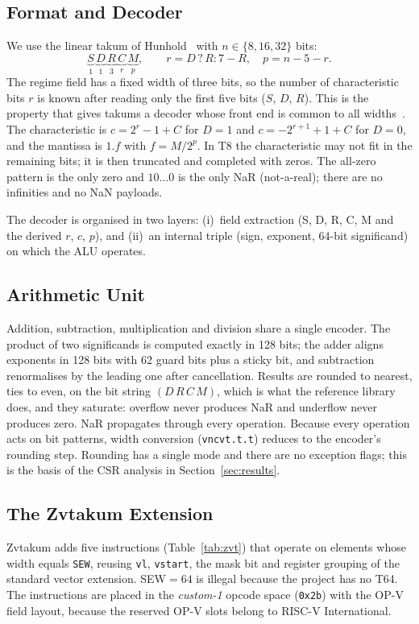 \documentclass[conference]{IEEEtran}
\begin{document}
\subsection{Format and Decoder}
We use the linear takum of Hunhold~\cite{hunhold2024takum} with $n\in\{8,16,32\}$ bits:
\begin{equation}
\underbrace{S}_{1}\,\underbrace{D}_{1}\,\underbrace{R}_{3}\,\underbrace{C}_{r}\,\underbrace{M}_{p},
\qquad r = D\,?\,R : 7-R,\quad p = n-5-r .
\end{equation}
The regime field has a fixed width of three bits, so the number of characteristic
bits $r$ is known after reading only the first five bits ($S$, $D$, $R$). This is the
property that gives takums a decoder whose front end is common to all widths~\cite{hunhold2025avx}.
The characteristic is $c = 2^r-1+C$ for $D=1$ and $c=-2^{r+1}+1+C$ for $D=0$, and the
mantissa is $1.f$ with $f=M/2^p$. In T8 the characteristic may not fit in the
remaining bits; it is then truncated and completed with zeros. The all-zero pattern is the
only zero and $10\ldots0$ is the only NaR (not-a-real); there are no infinities and no NaN payloads.

The decoder is organised in two layers: (i)~field extraction (S, D, R, C, M and the derived $r$, $c$, $p$),
and (ii)~an internal triple (sign, exponent, 64-bit significand) on which the ALU operates.

\subsection{Arithmetic Unit}
Addition, subtraction, multiplication and division share a single encoder. The product of two
significands is computed exactly in 128 bits; the adder aligns exponents in 128 bits with
62 guard bits plus a sticky bit, and subtraction renormalises by the leading one after cancellation.
Results are rounded to nearest, ties to even, on the bit string $(D\,R\,C\,M)$, which
is what the reference library does, and they saturate: overflow never produces NaR and
underflow never produces zero. NaR propagates through every operation.
Because every operation acts on bit patterns, width conversion (\texttt{vncvt.t.t}) reduces to the
encoder's rounding step. Rounding has a single mode and there are no exception flags;
this is the basis of the CSR analysis in Section~\ref{sec:results}.

\subsection{The Zvtakum Extension}
Zvtakum adds five instructions (Table~\ref{tab:zvt}) that operate on elements whose width equals
\texttt{SEW}, reusing \texttt{vl}, \texttt{vstart}, the mask bit and register grouping of
the standard vector extension. SEW$=64$ is illegal because the project has no T64.
The instructions are placed in the \emph{custom-1} opcode space (\texttt{0x2b}) with the OP-V field layout, because the
reserved OP-V slots belong to RISC-V International.
\end{document}
